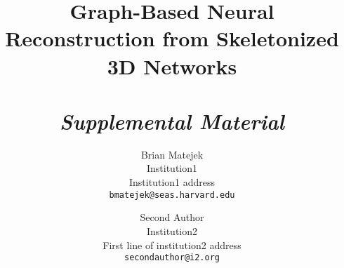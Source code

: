 \documentclass[10pt,twocolumn,letterpaper]{article}
\begin{document}
\title{Graph-Based Neural Reconstruction from Skeletonized 3D Networks\\~\\\textit{Supplemental Material}}

\author{Brian Matejek\\
Institution1\\
Institution1 address\\
{\tt\small bmatejek@seas.harvard.edu}
\and
Second Author\\
Institution2\\
First line of institution2 address\\
{\tt\small secondauthor@i2.org}
}

\maketitle





{\small


}
\end{document}
